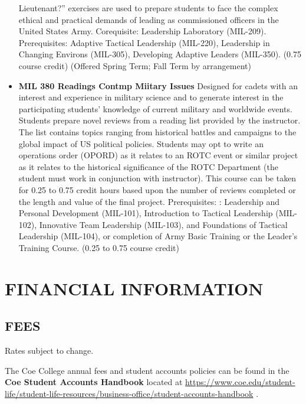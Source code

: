 \documentclass[
  letterpaper,
]{scrbook}
\renewcommand{\part}[1]{\addcontentsline{toc}{part}{#1}}
\begin{document}
\begin{itemize}
  Lieutenant?'' exercises are used to prepare students to face the
  complex ethical and practical demands of leading as commissioned
  officers in the United States Army. Corequisite: Leadership Laboratory
  (MIL-209). Prerequisites: Adaptive Tactical Leadership (MIL-220),
  Leadership in Changing Environs (MIL-305), Developing Adaptive Leaders
  (MIL-350). (0.75 course credit) (Offered Spring Term; Fall Term by
  arrangement)
\item
  \textbf{MIL 380 Readings Contmp Miitary Issues} Designed for cadets
  with an interest and experience in military science and to generate
  interest in the participating students' knowledge of current military
  and worldwide events. Students prepare novel reviews from a reading
  list provided by the instructor. The list contains topics ranging from
  historical battles and campaigns to the global impact of US political
  policies. Students may opt to write an operations order (OPORD) as it
  relates to an ROTC event or similar project as it relates to the
  historical significance of the ROTC Department (the student must work
  in conjunction with instructor). This course can be taken for 0.25 to
  0.75 credit hours based upon the number of reviews completed or the
  length and value of the final project. Prerequisites: : Leadership and
  Personal Development (MIL-101), Introduction to Tactical Leadership
  (MIL-102), Innovative Team Leadership (MIL-103), and Foundations of
  Tactical Leadership (MIL-104), or completion of Army Basic Training or
  the Leader's Training Course. (0.25 to 0.75 course credit)
\end{itemize}

\part{FINANCIAL RESOURCES}

\chapter{FINANCIAL INFORMATION}\label{sec-financial-information}

\section{FEES}\label{fees}

Rates subject to change.

The Coe College annual fees and student accounts policies can be found
in the \textbf{Coe Student Accounts Handbook} located at
\url{https://www.coe.edu/student-life/student-life-resources/business-office/student-accounts-handbook}
.
\end{document}
